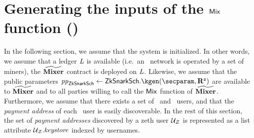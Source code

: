 
\section{Generating the inputs of the $\mathsf{Mix}$ function (\inp{\mix})}\label{zeth-protocol:mix-inp}

In the following section, we assume that the system is initialized. In other words, we assume that a ledger $\mathit{L}$ is available (i.e.~an \ethereum~network is operated by a set of miners), the $\widetilde{\mathbf{Mixer}}$ contract is deployed on $\mathit{L}$. Likewise, we assume that the public parameters $\pparams_{\zksnark} \gets \zksnark.\kgen(\secparam, \RELCIRC)$ are available to $\widetilde{\mathbf{Mixer}}$ and to all parties willing to call the $\mathsf{Mix}$ function of $\widetilde{\mathbf{Mixer}}$. Furthermore, we assume that there exists a set of \ethereum~and \zeth~users, and that the \emph{payment address} of each \zeth~user is easily discoverable. In the rest of this section, the set of \emph{payment addresses} discovered by a zeth user $\mathcal{{U}_{Z}}$ is represented as a list attribute $\mathcal{{U}_{Z}}.\mathit{keystore}$ indexed by usernames.

\medskip

